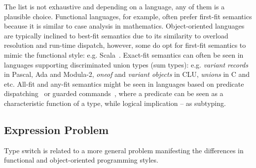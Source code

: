 \noindent
The list is not exhaustive and depending on a language, any of them
is a plausible choice. Functional languages, for example, often prefer 
first-fit semantics because it is similar to case analysis in mathematics. 
Object-oriented languages are typically inclined to best-fit semantics due 
to its similarity to overload resolution and run-time dispatch, however, some 
do opt for first-fit semantics to mimic the functional style: e.g. Scala~\cite{Scala2nd}. 
Exact-fit semantics can often be seen in languages supporting discriminated 
union types (sum types): e.g. \emph{variant records} in Pascal, Ada and Modula-2, 
\emph{oneof} and \emph{variant objects} in CLU, \emph{unions} in C and \Cpp{} etc. 
All-fit and any-fit semantics might be seen in languages based on predicate 
dispatching~\cite{ErnstKC98} or guarded commands~\cite{EWD:EWD472}, where a 
predicate can be seen as a characteristic function of a type, while logical 
implication -- as subtyping.

\subsection{Expression Problem}

Type switch is related to a more general problem manifesting the differences 
in functional and object-oriented programming styles.

%

